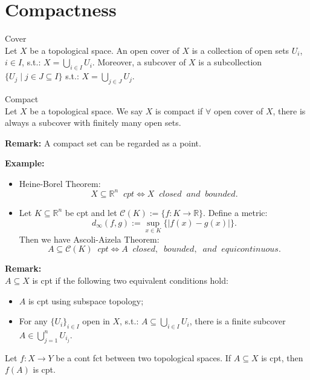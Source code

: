 \section{Compactness}

\begin{definition}{Cover}\\
Let $X$ be a topological space. An open cover of $X$ is a collection of open sets $U_i$, $i\in I$, s.t.: $X= \bigcup_{i\in I} U_i$. 
Moreover, a subcover of $X$ is a subcollection $\{U_j \mid j \in J \subseteq I\}$ s.t.: $X = \bigcup_{j\in J} U_j$.
\end{definition}

\begin{definition}{Compact}\\
Let $X $ be a topological space. We say $X$ is compact if $\forall$ open cover of $X$, there is always a subcover with finitely many open sets.
\end{definition}

\noindent\textbf{Remark:} A compact set can be regarded as a point.


\noindent\textbf{Example:} 
\begin{itemize}
    \item Heine-Borel Theorem:
    $$X \subseteq \mathbb{R}^n \;\;cpt \Leftrightarrow X \;\; closed \;\; and \;\; bounded.$$
    \item Let $K \subseteq \mathbb{R}^n$ be cpt and let $\mathcal{C}(K) := \{f:K \rightarrow \mathbb{R} \}$. Define a metric: 
    $$d_\infty (f,g) := \sup_{x\in K} \{| f(x) -g(x) | \}.$$
    Then we have Ascoli-Aizela Theorem:
    $$A \subseteq \mathcal{C}(K) \;\; cpt \Leftrightarrow A \;\; closed, \;\; bounded,\;\; and \;\; equicontinuous.$$
\end{itemize}

\noindent\textbf{Remark:}\\
$A \subseteq X$ is cpt if the following two equivalent conditions hold:
\begin{itemize}
    \item $A$ is cpt using subspace topology;
    \item For any $\{U_i\}_{i\in I}$ open in $X$, s.t.: $A \subseteq \bigcup _{i\in I} U_i$, there is a finite subcover $A \in \bigcup_{j=1}^n U_{i_j}$.
\end{itemize}

\begin{proposition}
    Let $f: X\rightarrow Y$ be a cont fct between two topological spaces. If $A \subseteq X$ is cpt, then $f(A)$ is cpt.
\end{proposition}

